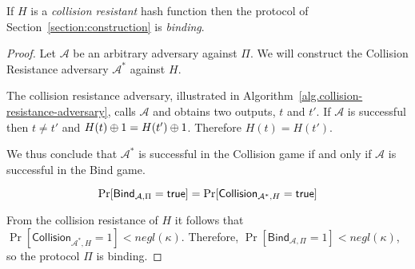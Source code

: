 \begin{theorem}[Binding]
  If $H$ is a \emph{collision resistant} hash function then the protocol of Section~\ref{section:construction} is \emph{binding}.
\end{theorem}
\begin{proof}
  Let $\mathcal{A}$ be an arbitrary adversary against $\Pi$.
  We will construct the Collision Resistance adversary $\mathcal{A}^*$ against $H$.

  The collision resistance adversary, illustrated in Algorithm~\ref{alg.collision-resistance-adversary}, calls $\mathcal{A}$ and obtains two outputs, $t$ and $t'$. If $\mathcal{A}$ is successful then $t \neq t'$ and $H(t) \oplus 1 = H(t') \oplus 1$. Therefore $H(t) = H(t')$.

  We thus conclude that $\mathcal{A^*}$ is successful in the \textsf{Collision} game if and only if $\mathcal{A}$ is successful in the \textsf{Bind} game.

  \[
    \Pr[\textsf{Bind}_{\mathcal{A},\Pi} = \mathsf{true}]
    =
    \Pr[\textsf{Collision}_{\mathcal{A}^*,H} = \mathsf{true}]
  \]

  From the collision resistance of $H$ it follows that $\Pr[\textsf{Collision}_{\mathcal{A}^*,H} = 1] < negl(\kappa)$. Therefore,
  $\Pr[\textsf{Bind}_{\mathcal{A},\Pi} = 1] < negl(\kappa)$, so
  the protocol $\Pi$ is binding.
\end{proof}


